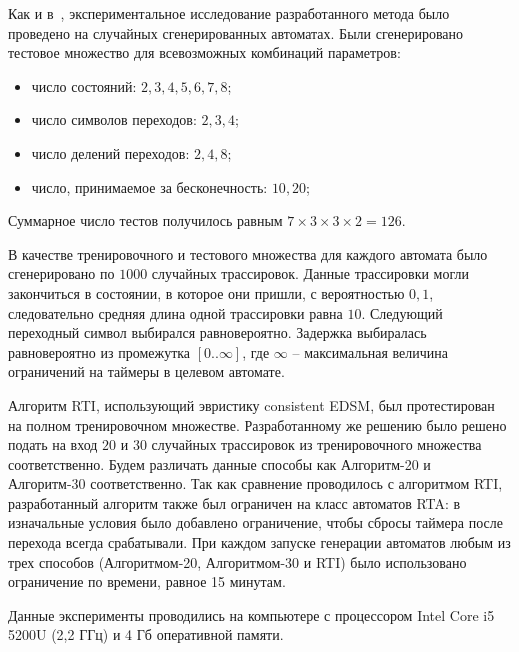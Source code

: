 \documentclass[times,specification,annotation]{itmo-student-thesis}
\begin{document}
Как и в~\cite{rti}, экспериментальное исследование разработанного метода было проведено на случайных сгенерированных автоматах.
Были сгенерировано тестовое множество для всевозможных комбинаций параметров:
\begin{itemize}
  \item число состояний: $2, 3, 4, 5, 6, 7, 8$;
  \item число символов переходов: $2, 3, 4$;
  \item число делений переходов: $2, 4, 8$;
  \item число, принимаемое за бесконечность: $10, 20$;
\end{itemize}

Суммарное число тестов получилось равным $7 \times 3 \times 3 \times 2 = 126$. 

В качестве тренировочного и тестового множества для каждого автомата 
было сгенерировано по $1000$ случайных трассировок. Данные трассировки могли закончиться в состоянии, в которое они пришли, с вероятностью $0,1$, следовательно
средняя длина одной трассировки равна $10$. Следующий переходный символ выбирался равновероятно. Задержка выбиралась равновероятно из промежутка $[0..\infty]$, 
где $\infty$ -- максимальная величина ограничений на таймеры в целевом автомате.

Алгоритм RTI, использующий эвристику consistent EDSM, был
протестирован на полном тренировочном множестве. Разработанному же решению было решено подать на вход $20$ и $30$ случайных трассировок из тренировочного множества соответственно.
Будем различать данные способы как Алгоритм-20 и Алгоритм-30 соответственно.
Так как сравнение проводилось с алгоритмом RTI, разработанный алгоритм также был ограничен на класс автоматов RTA:
в изначальные условия было добавлено ограничение, чтобы сбросы таймера после перехода всегда срабатывали. При каждом запуске генерации автоматов любым из трех способов
(Алгоритмом-20, Алгоритмом-30 и RTI) было использовано ограничение по времени, равное 15 минутам. 

Данные эксперименты проводились на компьютере с процессором Intel Core i5 5200U (2,2 ГГц) и 4 Гб оперативной памяти.
\end{document}
